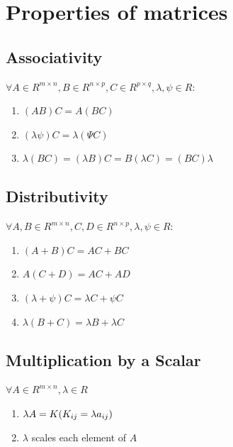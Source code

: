 \section{Properties of matrices}

\subsection{Associativity \cite{mfml-1}}\label{matrix: Associativity}

$\forall A \in R^{m\times n} , B \in R^{n\times p} , C \in R^{p\times q} , \lambda, \psi \in R$:

\begin{enumerate}
    \item $(AB)C = A(BC)$
    
    \item $(\lambda\psi)C = \lambda(\Psi C)$

    \item  $\lambda(BC) = (\lambda B)C = B(\lambda C) = (BC)\lambda$
\end{enumerate}


\subsection{Distributivity \cite{mfml-1}}\label{matrix: Distributivity}

$\forall A, B \in R^{m\times n} , C, D \in R^{n\times p} , \lambda, \psi \in R$:

\begin{enumerate}
    \item $(A + B)C = AC + BC$
    \item $A(C + D) = AC + AD$
    \item $(\lambda + \psi)C = \lambda C + \psi C$
    \item $\lambda (B + C) = \lambda B + \lambda C$
\end{enumerate}



\subsection{Multiplication by a Scalar \cite{mfml-1}} \label{matrix: Multiplication by a Scalar}
$\forall A \in  R^{m\times n} , \lambda  \in  R$

\begin{enumerate}

    \item $\lambda A = K \hfill (K_{ij} = \lambda a_{ij})$

    \item $\lambda$ scales each element of $A$
\end{enumerate}


